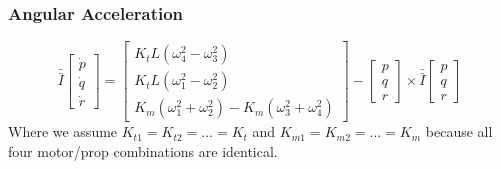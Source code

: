 \documentclass{article}
\numberwithin{equation}{section}
\newcommand{\omegaVec}{
\left[ \begin{array}{ccc}
p\\
q\\
r \end{array} \right]
}
\begin{document}
\subsubsection{Angular Acceleration}
\begin{equation}
  \label{angAccelMot}
  \bar{\bar{I}} \left[ \begin{array}{ccc} \dot{p} \\ 
  							\dot{q} \\ 
							\dot{r} \end{array} \right]
  =
  \left[ \begin{array}{ccc} K_{t}L\left(\omega_4^2 - \omega_3^2\right) \\ 
  				      K_{t}L\left(\omega_1^2 - \omega_2^2\right) \\ 
				      K_{m}\left(\omega_1^2 + \omega_2^2\right) - K_{m}\left(\omega_3^2 +\omega_4^2\right) \end{array} \right]
				      -
				      \omegaVec \times \bar{\bar{I}} \omegaVec
  \end{equation}
 Where we assume $K_{t1} = K_{t2} = ... = K_{t}$ and $K_{m1} = K_{m2} = ... = K_{m}$ because all four motor/prop combinations are identical.
\end{document}
